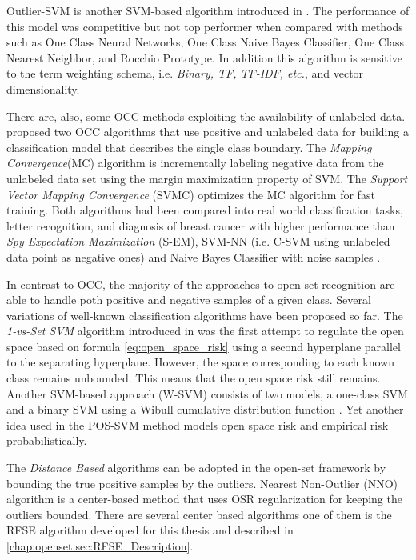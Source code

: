 Outlier-SVM is another SVM-based algorithm introduced in \parencite{manevitz2002one,khan2010survey}. The performance of this model was competitive but not top performer when compared with methods such as One Class Neural Networks, One Class Naive Bayes Classifier, One Class Nearest Neighbor, and Rocchio Prototype. In addition this algorithm is sensitive to the term weighting schema, i.e. \textit{Binary, TF, TF-IDF, etc.}, and vector dimensionality. 

There are, also, some OCC methods exploiting the availability of unlabeled data. \parencite{yu2005single} proposed two OCC algorithms that use positive and unlabeled data for building a classification model that describes the single class boundary. The \textit{Mapping Convergence}(MC) algorithm is incrementally labeling negative data from the unlabeled data set using the margin maximization property of SVM. The \textit{Support Vector Mapping Convergence} (SVMC) optimizes the MC algorithm for fast training. Both algorithms had been compared into real world  classification tasks, letter recognition, and diagnosis of breast cancer with higher performance than \textit{Spy Expectation Maximization} (S-EM), SVM-NN (i.e. C-SVM using unlabeled data point as negative ones) and Naive Bayes Classifier with noise samples \parencite{liu2002partially, li2003learning}.

In contrast to OCC, the majority of the approaches to open-set recognition are able to handle poth positive and negative samples of a given class. Several variations of well-known classification algorithms have been proposed so far. The \textit{1-vs-Set SVM} algorithm introduced in \parencite{scheirer2013toward} was the first attempt to regulate the open space based on formula \ref{eq:open_space_risk} using a second hyperplane parallel to the separating hyperplane. However, the space corresponding to each known class remains unbounded. This means that the open space risk still remains. Another SVM-based approach (W-SVM) consists of two models, a one-class SVM and a binary SVM using a Wibull cumulative distribution function \parencite{scheirer2014probability}. Yet another idea used in the POS-SVM method \parencite{scherreik2016open} models open space risk and empirical risk probabilistically. 

The \textit{Distance Based} algorithms can be adopted in the open-set framework by bounding the true positive samples by the outliers. Nearest Non-Outlier (NNO) algorithm is a center-based method that uses OSR regularization for keeping the outliers bounded. There are several center based algorithms one of them is the RFSE algorithm developed for this thesis and described in \ref{chap:openset:sec:RFSE_Description}. 

